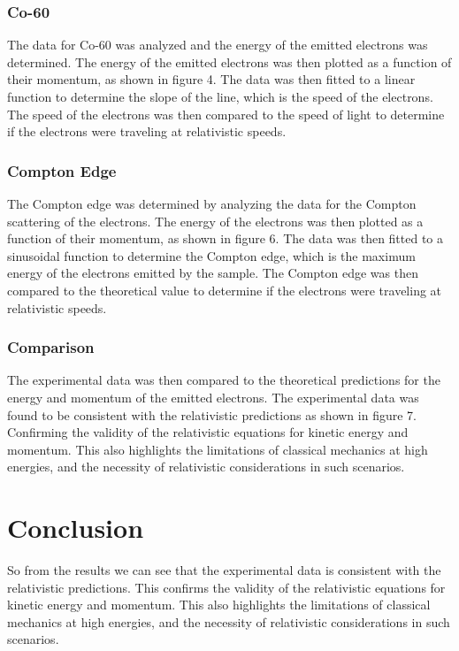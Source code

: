 \documentclass[12pt]{article}
\begin{document}
                \subsubsection{Co-60}
                The data for Co-60 was analyzed and the energy of the emitted electrons was determined. 
                The energy of the emitted electrons was then plotted as a function of their momentum, 
                as shown in figure 4. The data was then fitted to a linear function to determine the slope 
                of the line, which is the speed of the electrons. The speed of the electrons was then compared 
                to the speed of light to determine if the electrons were traveling at relativistic speeds.

                \subsubsection{Compton Edge}
                The Compton edge was determined by analyzing the data for the Compton scattering of the electrons. 
                The energy of the electrons was then plotted as a function of their momentum, as shown in figure 6. 
                The data was then fitted to a sinusoidal function to determine the Compton edge, which is the maximum 
                energy of the electrons emitted by the sample. The Compton edge was then compared to the theoretical 
                value to determine if the electrons were traveling at relativistic speeds.

                \subsubsection{Comparison}
                The experimental data was then compared to the theoretical predictions for the energy and momentum of the 
                emitted electrons. The experimental data was found to be consistent with the relativistic predictions as shown in figure 7. 
                Confirming the validity of the relativistic equations for kinetic energy and momentum. This also highlights 
                the limitations of classical mechanics at high energies, and the necessity of relativistic considerations in such scenarios.
        





\section{Conclusion}
        So from the results we can see that the experimental data is consistent with the relativistic predictions. This confirms the validity of the relativistic equations for kinetic energy and momentum. This also highlights the limitations of classical mechanics at high energies, and the necessity of relativistic considerations in such scenarios.
\end{document}
